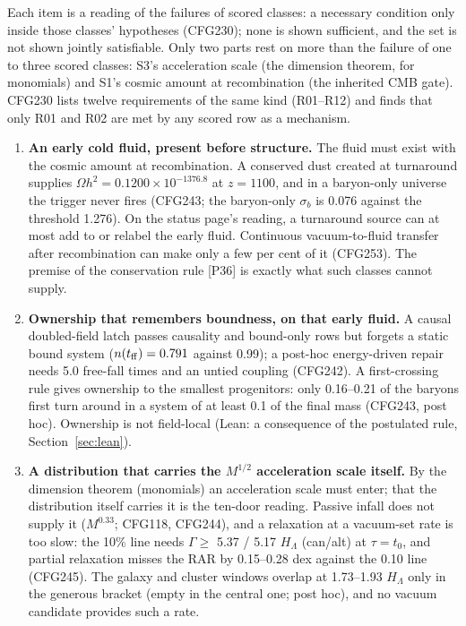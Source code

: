 \documentclass[10pt]{article}
\begin{document}
Each item is a reading of the failures of scored classes: a necessary condition only inside those classes' hypotheses (CFG230); none is shown sufficient, and the set is not shown jointly satisfiable. Only two parts rest on more than the failure of one to three scored classes: S3's acceleration scale (the dimension theorem, for monomials) and S1's cosmic amount at recombination (the inherited CMB gate). CFG230 lists twelve requirements of the same kind (R01--R12) and finds that only R01 and R02 are met by any scored row as a mechanism.
\begin{enumerate}[label=S\arabic*.]
\item \textbf{An early cold fluid, present before structure.} The fluid must exist with the cosmic amount at recombination. A conserved dust created at turnaround supplies $\Omega h^2=0.1200\times10^{-1376.8}$ at $z=1100$, and in a baryon-only universe the trigger never fires (CFG243; the baryon-only $\sigma_b$ is 0.076 against the threshold 1.276). On the status page's reading, a turnaround source can at most add to or relabel the early fluid. Continuous vacuum-to-fluid transfer after recombination can make only a few per cent of it (CFG253). The premise of the conservation rule [P36] is exactly what such classes cannot supply.
\item \textbf{Ownership that remembers boundness, on that early fluid.} A causal doubled-field latch passes causality and bound-only rows but forgets a static bound system ($n(t_{\rm ff})=0.791$ against 0.99); a post-hoc energy-driven repair needs 5.0 free-fall times and an untied coupling (CFG242). A first-crossing rule gives ownership to the smallest progenitors: only 0.16--0.21 of the baryons first turn around in a system of at least 0.1 of the final mass (CFG243, post hoc). Ownership is not field-local (Lean: a consequence of the postulated rule, Section~\ref{sec:lean}).
\item \textbf{A distribution that carries the $M^{1/2}$ acceleration scale itself.} By the dimension theorem (monomials) an acceleration scale must enter; that the distribution itself carries it is the ten-door reading. Passive infall does not supply it ($M^{0.33}$; CFG118, CFG244), and a relaxation at a vacuum-set rate is too slow: the 10\% line needs $\Gamma\ge$ 5.37 / 5.17 $H_\Lambda$ (can/alt) at $\tau=t_0$, and partial relaxation misses the RAR by 0.15--0.28 dex against the 0.10 line (CFG245). The galaxy and cluster windows overlap at 1.73--1.93 $H_\Lambda$ only in the generous bracket (empty in the central one; post hoc), and no vacuum candidate provides such a rate.

\end{enumerate}
\end{document}

